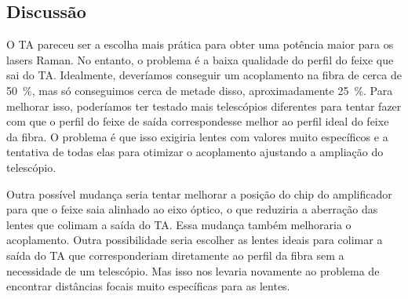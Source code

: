 \subsection{Discussão}

O \gls{TA} pareceu ser a escolha mais prática para obter uma potência maior para os lasers Raman. No entanto, o problema é a baixa qualidade do perfil do feixe que sai do \gls{TA}. Idealmente, deveríamos conseguir um acoplamento na fibra de cerca de \SI{50}{\percent}, mas só conseguimos cerca de metade disso, aproximadamente \SI{25}{\percent}. Para melhorar isso, poderíamos ter testado mais telescópios diferentes para tentar fazer com que o perfil do feixe de saída correspondesse melhor ao perfil ideal do feixe da fibra. O problema é que isso exigiria lentes com valores muito específicos e a tentativa de todas elas para otimizar o acoplamento ajustando a ampliação do telescópio.

Outra possível mudança seria tentar melhorar a posição do chip do amplificador para que o feixe saia alinhado ao eixo óptico, o que reduziria a aberração das lentes que colimam a saída do \gls{TA}. Essa mudança também melhoraria o acoplamento. Outra possibilidade seria escolher as lentes ideais para colimar a saída do \gls{TA} que corresponderiam diretamente ao perfil da fibra sem a necessidade de um telescópio. Mas isso nos levaria novamente ao problema de encontrar distâncias focais muito específicas para as lentes.
